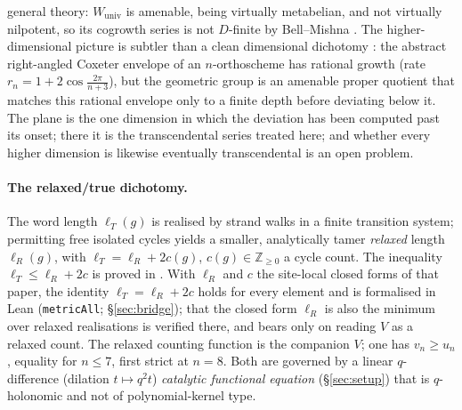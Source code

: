 \documentclass[11pt]{article}
\theoremstyle{plain}
\theoremstyle{definition}
\theoremstyle{remark}
\newcommand{\Z}{\mathbb{Z}}
\begin{document}
general theory: $W_{\mathrm{univ}}$ is amenable, being virtually metabelian, and not virtually
nilpotent, so its cogrowth series is not $D$-finite by Bell--Mishna \cite{BellMishna2020}. The
higher-dimensional picture is subtler than a clean dimensional dichotomy \cite{Bonfioli2026c}: the
abstract right-angled Coxeter envelope of an $n$-orthoscheme has rational growth (rate
$r_n=1+2\cos\frac{2\pi}{n+3}$), but the geometric group is an amenable proper quotient that matches
this rational envelope only to a finite depth before deviating below it. The plane is the one
dimension in which the deviation has been computed past its onset; there it is the transcendental
series treated here; and whether every higher dimension is likewise eventually transcendental is
an open problem.

\paragraph{The relaxed/true dichotomy.} The word length $\ell_T(g)$ is realised by strand walks in
a finite transition system; permitting free isolated cycles yields a smaller, analytically tamer
\emph{relaxed} length $\ell_R(g)$, with $\ell_T=\ell_R+2c(g)$, $c(g)\in\Z_{\ge0}$ a cycle count.
The inequality $\ell_T\le\ell_R+2c$ is proved in \cite{Bonfioli2026a}. With $\ell_R$ and $c$ the
site-local closed forms of that paper, the identity $\ell_T=\ell_R+2c$ holds for every element and
is formalised in Lean (\texttt{metricAll}; \S\ref{sec:bridge}); that the closed form $\ell_R$ is
also the minimum over relaxed realisations is verified there, and bears only on reading $V$ as a
relaxed count.
The relaxed counting function is the companion $V$; one has $v_n\ge u_n$, equality for $n\le7$,
first strict at $n=8$. Both are governed by a linear $q$-difference (dilation $t\mapsto q^2t$)
\emph{catalytic functional equation} (\S\ref{sec:setup}) that is $q$-holonomic and not of
polynomial-kernel type.
\end{document}
